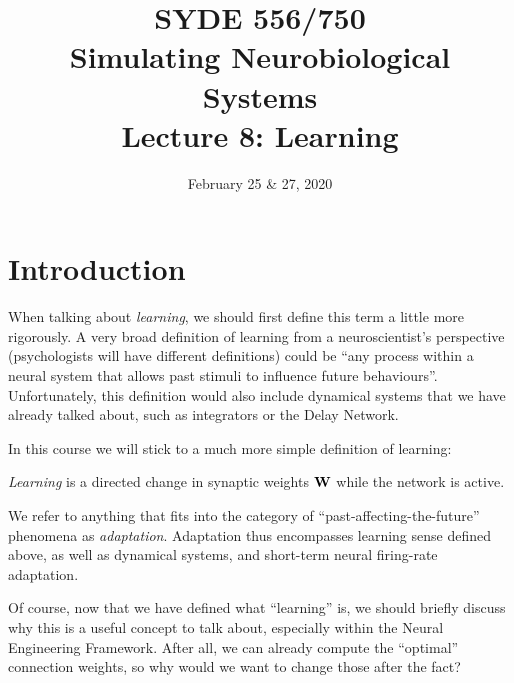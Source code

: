 \documentclass[10pt,letterpaper,oneside]{article}
\date{February 25 \& 27, 2020}
\title{SYDE 556/750 \\ Simulating Neurobiological Systems \\ Lecture 8: Learning}
\begin{document}

\section{Introduction}


When talking about \emph{learning}, we should first define this term a little more rigorously. A very broad definition of learning from a neuroscientist's perspective (psychologists will have different definitions) could be \enquote{any process within a neural system that allows past stimuli to influence future behaviours}. Unfortunately, this definition would also include dynamical systems that we have already talked about, such as integrators or the Delay Network.

In this course we will stick to a much more simple definition of learning:
\begin{mdframed}
	\emph{Learning} is a directed change in synaptic weights ${\mathbf{W}}$ while the network is active.
\end{mdframed}
We refer to anything that fits into the category of \enquote{past-affecting-the-future} phenomena as \emph{adaptation}. Adaptation thus encompasses learning sense defined above, as well as dynamical systems, and short-term neural firing-rate adaptation.

Of course, now that we have defined what \enquote{learning} is, we should briefly discuss why this is a useful concept to talk about, especially within the Neural Engineering Framework. After all, we can already compute the \enquote{optimal} connection weights, so why would we want to change those after the fact?
\end{document}
